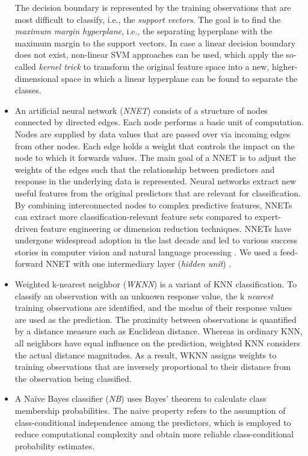 \documentclass[
  oneside]{book}
\begin{document}
\begin{itemize}
  The decision boundary is represented by the training observations that are most difficult to classify, i.e., the \emph{support vectors}.
  The goal is to find the \emph{maximum margin hyperplane}, i.e., the separating hyperplane with the maximum margin to the support vectors.
  In case a linear decision boundary does not exist, non-linear SVM approaches can be used, which apply the so-called \emph{kernel trick} to transform the original feature space into a new, higher-dimensional space in which a linear hyperplane can be found to separate the classes.
\item
  An artificial neural network (\emph{NNET}) consists of a structure of nodes connected by directed edges.
  Each node performs a basic unit of computation.
  Nodes are supplied by data values that are passed over via incoming edges from other nodes.
  Each edge holds a weight that controls the impact on the node to which it forwards values.
  The main goal of a NNET is to adjust the weights of the edges such that the relationship between predictors and response in the underlying data is represented.
  Neural networks extract new useful features from the original predictors that are relevant for classification.
  By combining interconnected nodes to complex predictive features, NNETs can extract more classification-relevant feature sets compared to expert-driven feature engineering or dimension reduction techniques.
  NNETs have undergone widespread adoption in the last decade and led to various success stories in computer vision and natural language processing \autocite{Goodfellow:DL2016}. We used a feed-forward NNET with one intermediary layer (\emph{hidden unit}) \autocite{nnet}.
\item
  Weighted k-nearest neighbor \autocite{Hechenbichler:wknn2004} (\emph{WKNN}) is a variant of KNN classification.
  To classify an observation with an unknown response value, the k \emph{nearest} training observations are identified, and the modus of their response values are used as the prediction.
  The proximity between observations is quantified by a distance measure such as Euclidean distance.
  Whereas in ordinary KNN, all neighbors have equal influence on the prediction, weighted KNN considers the actual distance magnitudes.
  As a result, WKNN assigns weights to training observations that are inversely proportional to their distance from the observation being classified.
\item
  A Naïve Bayes classifier (\emph{NB}) uses Bayes' theorem to calculate class membership probabilities.
  The naive property refers to the assumption of class-conditional independence among the predictors, which is employed to reduce computational complexity and obtain more reliable class-conditional probability estimates.

\end{itemize}
\end{document}
